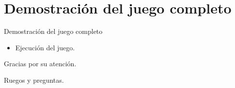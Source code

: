\documentclass[10pt]{beamer}
\begin{document}
\section{Demostración del juego completo}
\begin{frame}{Demostración del juego completo}
\begin{itemize}[<+- | alert@+>]
	\item Ejecución del juego.
\end{itemize}
\end{frame}

\begin{frame}[standout]
  Gracias por su atención.
\end{frame}


\begin{frame}[standout]
  Ruegos y preguntas.
\end{frame}
\end{document}
